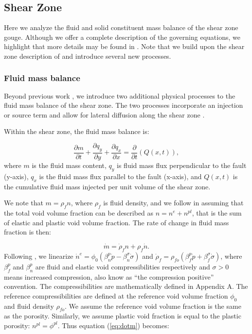 \documentclass[draft]{agujournal2019}
\begin{document}
\subsection{Shear Zone}

Here we analyze the fluid and solid constituent mass balance of the shear zone gouge. Although we offer a complete description of the governing equations, we highlight that more details may be found in . Note that we build upon the shear zone description of  and introduce several new processes. 

\subsubsection{Fluid mass balance} \label{sec:fluid}

Beyond previous work \cite{Heimisson2021}, we introduce two additional physical processes to the fluid mass balance of the shear zone. The two processes incorporate an injection or source term and allow for lateral diffusion along the shear zone .

Within the shear zone, the fluid mass balance is:

\begin{equation}
    \frac{\partial m}{\partial t} + \frac{\partial q_y}{\partial y} + \frac{\partial q_x}{\partial x}  = \frac{\partial}{\partial t} ( Q(x,t) ),
    \label{eq:cons}
\end{equation}
where $m$ is the fluid mass content, $q_y$ is fluid mass flux perpendicular to the fault (y-axis), $q_x$ is the fluid mass flux parallel to the fault (x-axis), and $Q(x,t)$ is the cumulative fluid mass injected per unit volume of the shear zone.

We note that $m =  \rho_f n$, where $\rho_f$ is fluid density, and we follow  in assuming that the total void volume fraction can be described as $n = n^e + n^{pl}$, that is the sum of elastic and plastic void volume fraction. The rate of change in fluid mass fraction is then:

\begin{equation}
    \dot{m} = \dot{\rho}_f n + \rho_f \dot{n}.
    \label{eq:dotm}
\end{equation}
Following , we linearize $\dot{n}^e = \phi_0 (\beta_n^p \dot{p} - \beta_n^{\sigma} \dot{\sigma} )$ and $\dot{\rho}_f = \rho_{fo}(\beta_f^p \dot{p} + \beta_f^\sigma \dot{\sigma} )$, where $\beta_f^p$ and $\beta_n^p$ are fluid and elastic void compressibilities respectively and $\sigma > 0$ means increased compression, also know as ``the compression positive'' convention. The compressibilities are mathematically defined in Appendix A. The reference compressibilities are defined at the reference void volume fraction $\phi_0$ and fluid density $\rho_{fo}$. We assume the reference void volume fraction is the same as the porosity. Similarly, we assume plastic void fraction is equal to the plastic porosity: $n^{pl} = \phi^{pl}$. Thus equation (\ref{eq:dotm}) becomes: 
\end{document}
